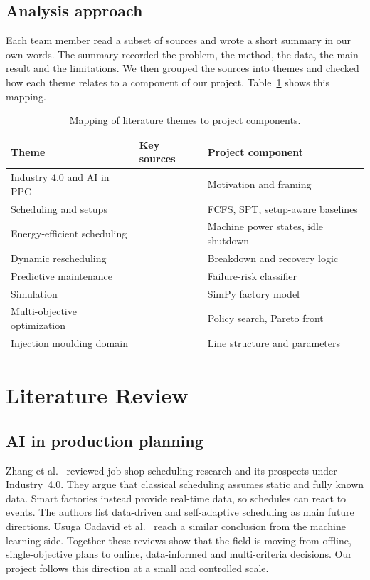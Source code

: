 \documentclass[11pt,a4paper]{article}
\begin{document}
\subsection{Analysis approach}
Each team member read a subset of sources and wrote a short summary in our own words. The summary recorded the problem, the method, the data, the main result and the limitations. We then grouped the sources into themes and checked how each theme relates to a component of our project. Table~\ref{tab:map} shows this mapping.

\begin{table}[H]
\centering
\small
\begin{tabularx}{\textwidth}{>{\raggedright}p{4.2cm}X>{\raggedright\arraybackslash}p{4.2cm}}
\toprule
\textbf{Theme} & \textbf{Key sources} & \textbf{Project component} \\
\midrule
Industry 4.0 and AI in PPC & \cite{kagermann2013,lee2015,usuga2020,zhang2019} & Motivation and framing \\
Scheduling and setups & \cite{pinedo2016,allahverdi2008} & FCFS, SPT, setup-aware baselines \\
Energy-efficient scheduling & \cite{mouzon2007,gahm2016,duan2021} & Machine power states, idle shutdown \\
Dynamic rescheduling & \cite{vieira2003,ouelhadj2009} & Breakdown and recovery logic \\
Predictive maintenance & \cite{carvalho2019,matzka2020,breiman2001,pedregosa2011} & Failure-risk classifier \\
Simulation & \cite{law2015,negahban2014,simpy} & SimPy factory model \\
Multi-objective optimization & \cite{deb2002,akiba2019} & Policy search, Pareto front \\
Injection moulding domain & \cite{rosato2000,thiriez2006,eugmp2022,iso50001,gx_pfreimd} & Line structure and parameters \\
\bottomrule
\end{tabularx}
\caption{Mapping of literature themes to project components.}
\label{tab:map}
\end{table}

\section{Literature Review}
\label{sec:lit}

\subsection{AI in production planning}
Zhang et al.\ \cite{zhang2019} reviewed job-shop scheduling research and its prospects under Industry~4.0. They argue that classical scheduling assumes static and fully known data. Smart factories instead provide real-time data, so schedules can react to events. The authors list data-driven and self-adaptive scheduling as main future directions. Usuga Cadavid et al.\ \cite{usuga2020} reach a similar conclusion from the machine learning side. Together these reviews show that the field is moving from offline, single-objective plans to online, data-informed and multi-criteria decisions. Our project follows this direction at a small and controlled scale.
\end{document}
